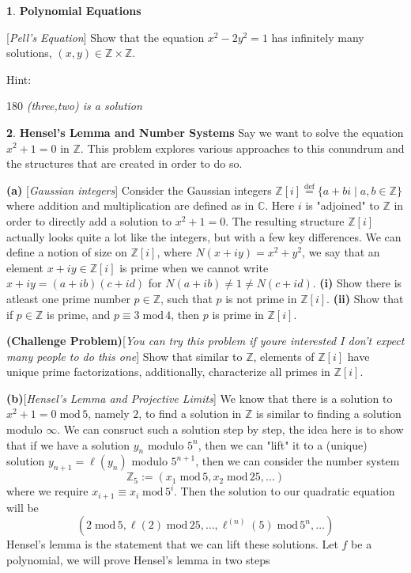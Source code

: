 \documentclass[11pt]{article}
\theoremstyle{definition}
\newtheorem{pb}{}
\newcommand{\set}[1]{\{#1\}}
\begin{document}
\begin{pb}
    \textbf{Polynomial Equations}

    [\emph{Pell's Equation}] Show that the equation \(x^2 - 2y^2 = 1\) has infinitely many solutions, \((x,y) \in \mathbb{Z} \times \mathbb{Z}\).

    \vspace{0.1cm}
    Hint: \begin{rotate}{180}
        \hspace{-4cm} \emph{(three,two) is a solution}
    \end{rotate}
    \vspace{0.1cm}

\end{pb}
\begin{pb}
    \textbf{Hensel's Lemma and Number Systems} Say we want to solve the equation \(x^2 + 1 = 0\) in \(\mathbb{Z}\). This problem explores various approaches to this conundrum and the structures that are created in order to do so.

    \textbf{(a)} [\emph{Gaussian integers}] Consider the Gaussian integers \(\mathbb{Z}[i] \overset{\text{def}}{=} \set{a+bi \mid a,b \in \mathbb{Z}}\) where addition and multiplication are defined as in \(\mathbb{C}\). Here \(i\) is "adjoined" to \(\mathbb{Z}\) in order to directly add a solution to \(x^2 + 1 = 0\). The resulting structure \(\mathbb{Z}[i]\) actually looks quite a lot like the integers, but with a few key differences. We can define a notion of size on \(\mathbb{Z}[i]\), where \(N(x + iy) = x^2 + y^2\), we say that an element \(x + iy \in \mathbb{Z}[i]\) is prime when we cannot write \(x + iy = (a + ib)(c + id)\) for \(N(a + ib) \neq 1 \neq N(c + id)\). \textbf{(i)} Show there is atleast one prime number \(p \in \mathbb{Z}\), such that \(p\) is not prime in \(\mathbb{Z}[i]\). \textbf{(ii)} Show that if \(p \in \mathbb{Z}\) is prime, and \(p \equiv 3 \;\text{mod}\,4\), then \(p\) is prime in \(\mathbb{Z}[i]\).

    \textbf{(Challenge Problem)}[\emph{You can try this problem if youre interested I don't expect many people to do this one}] Show that similar to \(\mathbb{Z}\), elements of \(\mathbb{Z}[i]\) have unique prime factorizations, additionally, characterize all primes in \(\mathbb{Z}[i]\).

    \textbf{(b)}[\emph{Hensel's Lemma and Projective Limits}] We know that there is a solution to \(x^2 + 1 = 0 \; \text{mod}\,5\), namely \(2\), to find a solution in \(\mathbb{Z}\) is similar to finding a solution modulo \(\infty\). We can consruct such a solution step by step, the idea here is to show that if we have a solution \(y_n\) modulo \(5^n\), then we can "lift" it to a (unique) solution \(y_{n+1} = \ell(y_n)\) modulo \(5^{n+1}\), then we can consider the number system \[\mathbb{Z}_5 := (x_1\;\text{mod}\,5, x_2\;\text{mod}\,25,\hdots)\]
    where we require \(x_{i+1} \equiv x_i \; \text{mod}\,5^i\). Then the solution to our quadratic equation will be \[(2 \;\text{mod}\,5,\ell(2)\;\text{mod}\,25, \hdots, \ell^{(n)}(5) \;\text{mod}\,5^n, \hdots)\]
    Hensel's lemma is the statement that we can lift these solutions. Let \(f\) be a polynomial, we will prove Hensel's lemma in two steps


\end{pb}
\end{document}
